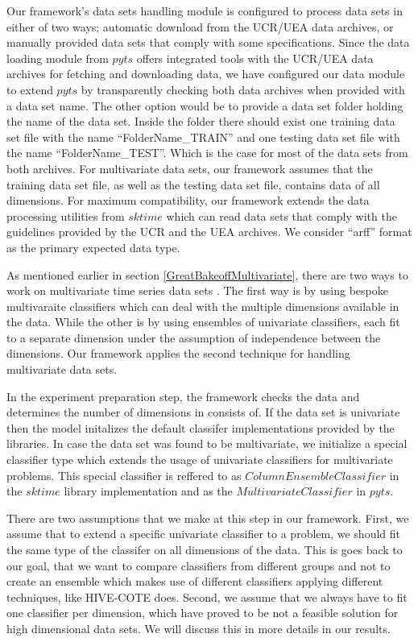 Our framework's data sets handling module is configured to process data sets in either of two ways; automatic download from the UCR/UEA data archives,
or manually provided data sets that comply with some specifications.
Since the data loading module from $pyts$ \cite{JMLR:v21:19-763} offers integrated tools with the UCR/UEA data archives for fetching and downloading data,
we have configured our data module to extend $pyts$ by transparently checking both data archives when provided with a data set name.
The other option would be to provide a data set folder holding the name of the data set.
Inside the folder there should exist one training data set file with the name \enquote{FolderName\_TRAIN} and one testing data set file with the name \enquote{FolderName\_TEST}.
Which is the case for most of the data sets from both archives.
For multivariate data sets, our framework assumes that the training data set file, as well as the testing data set file, contains data of all dimensions.
For maximum compatibility, our framework extends the data processing utilities from $sktime$ \cite{loning2019sktime}
which can read data sets that comply with the guidelines provided by the UCR and the UEA archives.
We consider \enquote{arff} format as the primary expected data type.

As mentioned earlier in section \ref{GreatBakeoffMultivariate}, there are two ways to work on multivariate time series data sets \cite{ruiz2020great}.
The first way is by using bespoke multivaraite classifiers which can deal with the multiple dimensions available in the data.
While the other is by using ensembles of univariate classifiers, each fit to a separate dimension under the assumption of independence between the dimensions.
Our framework applies the second technique for handling multivariate data sets.

In the experiment preparation step, the framework checks the data and determines the number of dimensions in consists of.
If the data set is univariate then the model initalizes the default classifer implementations provided by the libraries.
In case the data set was found to be multivariate, we initialize a special classifier type which extends the usage of univariate classifiers for multivariate problems.
This special classifier is reffered to as $ColumnEnsembleClassifier$ in the $sktime$ library implementation and as the $MultivariateClassifier$ in $pyts$.

There are two assumptions that we make at this step in our framework.
First, we assume that to extend a specific univariate classifier to a problem, we should fit the same type of the classifer on all dimensions of the data.
This is goes back to our goal, that we want to compare classifiers from different groups and not to create an ensemble which makes use of different classifiers
applying different techniques, like HIVE-COTE does.
Second, we assume that we always have to fit one classifier per dimension, which have proved to be not a feasible solution for high dimensional data sets.
We will discuss this in more details in our results.

